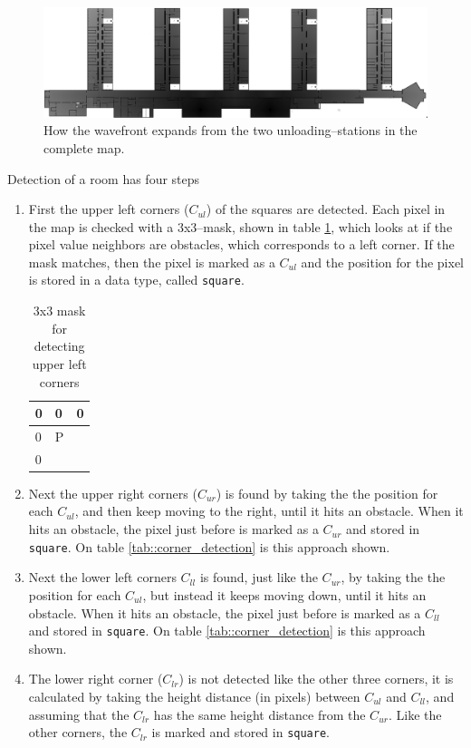 \begin{figure}[H]
\centering
\includegraphics[scale=0.33]{img/wavefront_path.png}
\caption{How the wavefront expands from the two unloading--stations in the complete map.}
\label{fig::path}
\end{figure}

Detection of a room has four steps
\begin{enumerate}\itemsep-3pt
\item First the upper left corners ($C_{ul}$) of the squares are detected. Each pixel in the map is checked with a 3x3--mask, shown in table \ref{tab::ul_mask}, which looks at if the pixel value neighbors are obstacles, which corresponds to a left corner. If the mask matches, then the pixel is marked as a $C_{ul}$ and the position for the pixel is stored in a data type, called \lstinline|square|. 

\begin{table}[H]
\centering
\begin{tabular}{|l|l|l|}
\hline
0 & 0 & 0 \\ \hline
0 & P &   \\ \hline
0 &   &   \\ \hline
\end{tabular}
\caption{3x3 mask for detecting upper left corners}
\label{tab::ul_mask}
\end{table}

\item Next the upper right corners ($C_{ur}$) is found by taking the the position for each $C_{ul}$, and then keep moving to the right, until it hits an obstacle. When it hits an obstacle, the pixel just before is marked as a $C_{ur}$ and stored in \lstinline|square|. On table \ref{tab::corner_detection} is this approach shown.
\item Next the lower left corners $C_{ll}$ is found, just like the $C_{ur}$, by taking the the position for each $C_{ul}$, but instead it keeps moving down, until it hits an obstacle. When it hits an obstacle, the pixel just before is marked as a $C_{ll}$ and stored in \lstinline|square|. On table \ref{tab::corner_detection} is this approach shown. 
\item The lower right corner ($C_{lr}$) is not detected like the other three corners, it is calculated by taking the height distance (in pixels) between $C_{ul}$ and $C_{ll}$, and assuming that the $C_{lr}$ has the same height distance from the $C_{ur}$. Like the other corners, the $C_{lr}$ is marked and stored in \lstinline|square|. 
\end{enumerate} 

